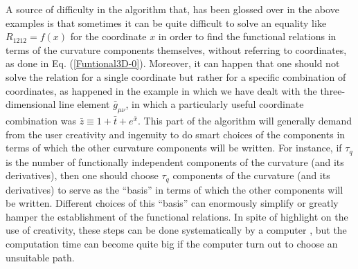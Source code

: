\documentclass[twocolumn,prd,aps,showpacs,showkeys,amsmath,amssymb]{revtex4-1}
\begin{document}
A source of difficulty in the algorithm that, has been glossed over in the above examples is that sometimes it can be quite difficult to solve an equality like $R_{1212} = f(x)$ for the coordinate $x$ in order to find the functional relations in terms of the curvature components themselves, without referring to coordinates, as done in Eq. (\ref{Funtional3D-0}). Moreover, it can happen that one should not solve the relation for a single coordinate but rather for a specific combination of coordinates, as happened in the example in which we have dealt with the three-dimensional line element $\bar{g}_{\mu\nu}$, in which a particularly useful coordinate combination was $\bar{z}\equiv 1 + \bar{t} + e^{\bar{x}} $. This part of the algorithm will generally demand from the user creativity and ingenuity to do smart choices of the components in terms of which the other curvature components will be written. For instance, if $\tau_q$ is the number of functionally independent components of the curvature (and its derivatives), then one should choose $\tau_q$ components of the curvature (and its derivatives) to serve as the ``basis'' in terms of which the other components will be written. Different choices of this ``basis'' can enormously simplify or greatly hamper the establishment of the functional relations. In spite of highlight on the use of creativity, these steps can be done systematically by a computer \cite{Aman1,Aman2,McCallum}, but the computation time can become quite big if the computer turn out to choose an unsuitable path.
\end{document}
